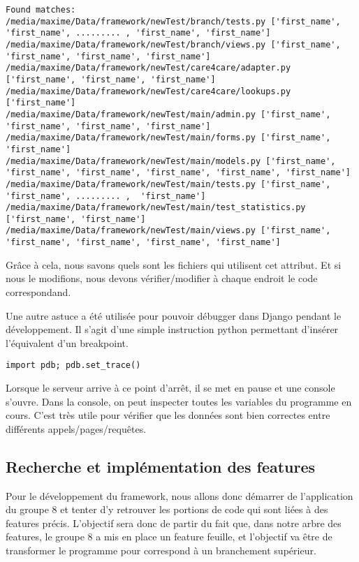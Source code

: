 \begin{lstlisting}
Found matches:
/media/maxime/Data/framework/newTest/branch/tests.py ['first_name', 'first_name', ......... , 'first_name', 'first_name']
/media/maxime/Data/framework/newTest/branch/views.py ['first_name', 'first_name', 'first_name', 'first_name']
/media/maxime/Data/framework/newTest/care4care/adapter.py ['first_name', 'first_name', 'first_name']
/media/maxime/Data/framework/newTest/care4care/lookups.py ['first_name']
/media/maxime/Data/framework/newTest/main/admin.py ['first_name', 'first_name', 'first_name', 'first_name']
/media/maxime/Data/framework/newTest/main/forms.py ['first_name', 'first_name']
/media/maxime/Data/framework/newTest/main/models.py ['first_name', 'first_name', 'first_name', 'first_name', 'first_name', 'first_name']
/media/maxime/Data/framework/newTest/main/tests.py ['first_name', 'first_name', ......... ,  'first_name']
/media/maxime/Data/framework/newTest/main/test_statistics.py ['first_name', 'first_name']
/media/maxime/Data/framework/newTest/main/views.py ['first_name', 'first_name', 'first_name', 'first_name', 'first_name']
\end{lstlisting}

Grâce à cela,  nous savons quels sont les fichiers qui utilisent cet attribut.  Et si nous le modifions,  nous devons vérifier/modifier à chaque endroit le code correspondand. 

Une autre astuce a été utilisée pour pouvoir débugger dans Django pendant le développement.  Il s'agit d'une simple instruction python permettant d'insérer l'équivalent d'un breakpoint. 
\begin{lstlisting}
import pdb; pdb.set_trace()
\end{lstlisting}
Lorsque le serveur arrive à ce point d'arrêt,  il se met en pause et une console s'ouvre.  
Dans la console,  on peut inspecter toutes les variables du programme en cours.  C'est très utile pour vérifier que les données sont bien correctes entre différents appels/pages/requêtes.

\subsection{Recherche et implémentation des features}

Pour le développement du framework,  nous allons donc démarrer de l'application du groupe 8 et tenter d'y retrouver les portions de code qui sont liées à des features précis.  L'objectif sera donc de partir du fait que,  dans notre arbre des features,  le groupe 8 a mis en place un feature feuille,  et l'objectif va être de transformer le programme pour correspond à un branchement supérieur.

